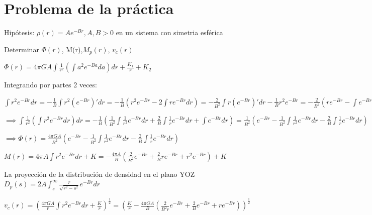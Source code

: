 \documentclass[12pt]{book}
\begin{document}
\section*{Problema de la práctica}
\begin{description}
\item Hipótesis: $\rho(r) = Ae^{-Br}, A,B > 0$  en un sistema con simetria esférica
\item Determinar $\Phi(r)$, M(r),$M_p(r)$, $v_c(r)$ 

\end{description}


\begin{description}
\item $\Phi(r) = 4 \pi G A \int{ \frac{1}{r^2}(\int{a^2 e^{-Ba}da})dr} + \frac{K_1}{r} + K_2$


\item Integrando por partes 2 veces:

\item $\int{r^2 e^{-Br}dr} = - \frac{1}{B} \int{r^2 (e^{-Br})\prime dr}
=-\frac{1}{B}( r^2 e^{-Br}  - 2\int{r e^{-Br}dr})  = -\frac{2}{B^2}\int{r (e^{-Br})\prime dr} - \frac{1}{B}r^2 e^{-Br} = -\frac{2}{B^2}(r e^{-Br} - \int{e^{-Br}dr}) - \frac{1}{B}r^2 e^{-Br} = -\frac{2}{B^3}e^{-Br} -\frac{2}{B^2}r e^{-Br} - \frac{1}{B}r^2 e^{-Br}  $

\item $\implies \int{ \frac{1}{r^2}(\int{r^2 e^{-Br}dr})dr} = -\frac{1}{B}(\frac{1}{B^2}\int{\frac{1}{r^2}e^{-Br}dr}  + 
\frac{2}{B}\int{\frac{1}{r} e^{-Br}dr} + \int{e^{-Br}dr} ) = \frac{1}{B^2}(e^{-Br} - \frac{1}{B^2}\int{\frac{1}{r^2}e^{-Br}dr} - \frac{2}{B}\int{\frac{1}{r} e^{-Br}dr} ) $

\item $\implies \Phi(r) = \frac{4 \pi G A}{B^2}(e^{-Br} - \frac{1}{B^2}\int{\frac{1}{r^2}e^{-Br}dr} - \frac{2}{B}\int{\frac{1}{r} e^{-Br}dr} ) $


\item $M(r) = 4 \pi A \int{r^2 e^{-Br}dr} + K = -\frac{4 \pi A}{B}(\frac{2}{B^2}e^{-Br} +\frac{2}{B}r e^{-Br} + r^2 e^{-Br}) + K$
\item La proyección de la distribución de densidad en el plano YOZ
$D_p(s) = 2 A \int_s^\infty{\frac{r}{\sqrt{r^2-s^2}} e^{-Br} dr}$

\item $v_c(r) = (\frac{4 \pi G A}{r}\int{r^2 e^{-Br}dr} + \frac{K}{r})^{\frac{1}{2}}   
= (\frac{K}{r} -\frac{4 \pi G A}{B}(\frac{2}{B^2r}e^{-Br} +\frac{2}{B} e^{-Br} + r e^{-Br} ))^{\frac{1}{2}} $

\end{description}
\end{document}
